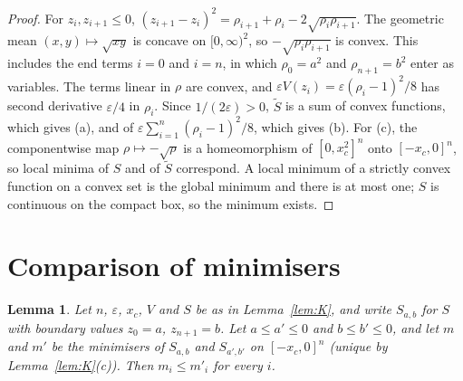 \documentclass[11pt,a4paper]{article}
\newtheorem{lemma}[theorem]{Lemma}
\theoremstyle{definition}
\theoremstyle{remark}
\newcommand{\xc}{x_c}
\begin{document}
\begin{proof}
For $z_i,z_{i+1}\le0$, $(z_{i+1}-z_i)^2=\rho_{i+1}+\rho_i-2\sqrt{\rho_i\rho_{i+1}}$. The geometric mean $(x,y)\mapsto\sqrt{xy}$ is concave on $[0,\infty)^2$, so $-\sqrt{\rho_i\rho_{i+1}}$ is convex. This includes the end terms $i=0$ and $i=n$, in which $\rho_0=a^2$ and $\rho_{n+1}=b^2$ enter as variables. The terms linear in $\rho$ are convex, and $\varepsilon V(z_i)=\varepsilon(\rho_i-1)^2/8$ has second derivative $\varepsilon/4$ in $\rho_i$. Since $1/(2\varepsilon)>0$, $\tilde S$ is a sum of convex functions, which gives (a), and of $\varepsilon\sum_{i=1}^n(\rho_i-1)^2/8$, which gives (b). For (c), the componentwise map $\rho\mapsto-\sqrt\rho$ is a homeomorphism of $[0,\xc^2]^n$ onto $[-\xc,0]^n$, so local minima of $S$ and of $\tilde S$ correspond. A local minimum of a strictly convex function on a convex set is the global minimum and there is at most one; $S$ is continuous on the compact box, so the minimum exists.
\end{proof}


\section{Comparison of minimisers}\label{app:CMP}

\begin{lemma}\label{lem:CMP}
Let $n$, $\varepsilon$, $\xc$, $V$ and $S$ be as in Lemma~\ref{lem:K}, and write $S_{a,b}$ for $S$ with boundary values $z_0=a$, $z_{n+1}=b$. Let $a\le a'\le0$ and $b\le b'\le0$, and let $m$ and $m'$ be the minimisers of $S_{a,b}$ and $S_{a',b'}$ on $[-\xc,0]^n$ \textup{(}unique by Lemma~\ref{lem:K}(c)\textup{)}. Then $m_i\le m'_i$ for every $i$.
\end{lemma}
\end{document}
